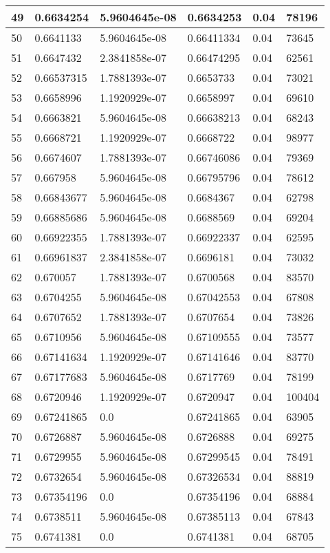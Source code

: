 \begin{longtable}{|l|l|l|l|l|l|}
49 & 0.6634254 & 5.9604645e-08 & 0.6634253 & 0.04 & 78196 \\ \hline 
50 & 0.6641133 & 5.9604645e-08 & 0.66411334 & 0.04 & 73645 \\ \hline 
51 & 0.6647432 & 2.3841858e-07 & 0.66474295 & 0.04 & 62561 \\ \hline 
52 & 0.66537315 & 1.7881393e-07 & 0.6653733 & 0.04 & 73021 \\ \hline 
53 & 0.6658996 & 1.1920929e-07 & 0.6658997 & 0.04 & 69610 \\ \hline 
54 & 0.6663821 & 5.9604645e-08 & 0.66638213 & 0.04 & 68243 \\ \hline 
55 & 0.6668721 & 1.1920929e-07 & 0.6668722 & 0.04 & 98977 \\ \hline 
56 & 0.6674607 & 1.7881393e-07 & 0.66746086 & 0.04 & 79369 \\ \hline 
57 & 0.667958 & 5.9604645e-08 & 0.66795796 & 0.04 & 78612 \\ \hline 
58 & 0.66843677 & 5.9604645e-08 & 0.6684367 & 0.04 & 62798 \\ \hline 
59 & 0.66885686 & 5.9604645e-08 & 0.6688569 & 0.04 & 69204 \\ \hline 
60 & 0.66922355 & 1.7881393e-07 & 0.66922337 & 0.04 & 62595 \\ \hline 
61 & 0.66961837 & 2.3841858e-07 & 0.6696181 & 0.04 & 73032 \\ \hline 
62 & 0.670057 & 1.7881393e-07 & 0.6700568 & 0.04 & 83570 \\ \hline 
63 & 0.6704255 & 5.9604645e-08 & 0.67042553 & 0.04 & 67808 \\ \hline 
64 & 0.6707652 & 1.7881393e-07 & 0.6707654 & 0.04 & 73826 \\ \hline 
65 & 0.6710956 & 5.9604645e-08 & 0.67109555 & 0.04 & 73577 \\ \hline 
66 & 0.67141634 & 1.1920929e-07 & 0.67141646 & 0.04 & 83770 \\ \hline 
67 & 0.67177683 & 5.9604645e-08 & 0.6717769 & 0.04 & 78199 \\ \hline 
68 & 0.6720946 & 1.1920929e-07 & 0.6720947 & 0.04 & 100404 \\ \hline 
69 & 0.67241865 & 0.0 & 0.67241865 & 0.04 & 63905 \\ \hline 
70 & 0.6726887 & 5.9604645e-08 & 0.6726888 & 0.04 & 69275 \\ \hline 
71 & 0.6729955 & 5.9604645e-08 & 0.67299545 & 0.04 & 78491 \\ \hline 
72 & 0.6732654 & 5.9604645e-08 & 0.67326534 & 0.04 & 88819 \\ \hline 
73 & 0.67354196 & 0.0 & 0.67354196 & 0.04 & 68884 \\ \hline 
74 & 0.6738511 & 5.9604645e-08 & 0.67385113 & 0.04 & 67843 \\ \hline 
75 & 0.6741381 & 0.0 & 0.6741381 & 0.04 & 68705 \\ \hline 
\end{longtable}